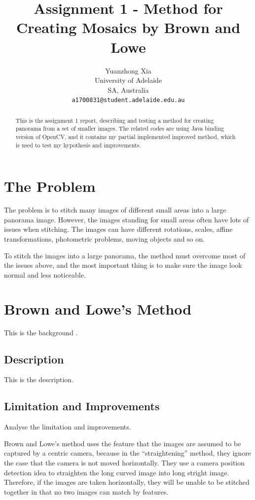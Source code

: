 \documentclass[10pt,twocolumn,letterpaper]{article}
\begin{document}
\title{Assignment 1 - Method for Creating Mosaics by Brown and Lowe}
\author{Yuanzhong Xia\\
University of Adelaide\\
SA, Australia\\
{\tt\small a1700831@student.adelaide.edu.au}
}
\maketitle

\begin{abstract}
This is the assignment 1 report, describing and testing a method for creating panorama from a set of smaller images.
The related codes are using Java binding version of OpenCV, and it contains my partial implemented improved method, which is used to test my hypothesis and improvements.
\end{abstract}


\section{The Problem}
The problem is to stitch many images of different small areas into a large panorama image.
However, the images standing for small areas often have lots of issues when stitching.
The images can have different rotations, scales, affine transformations, photometric problems, moving objects and so on.

To stitch the images into a large panorama, the method must overcome most of the issues above,
and the most important thing is to make sure the image look normal and less noticeable.


\section{Brown and Lowe's Method}
This is the background \cite{origin}.

\subsection{Description}
This is the description.

\subsection{Limitation and Improvements}
Analyse the limitation and improvements.

Brown and Lowe's method uses the feature that the images are assumed to be captured by a centric camera,
because in the ``straightening'' method, they ignore the case that the camera is not moved horizontally.
They use a camera position detection idea to straighten the long curved image into long stright image.
Therefore, if the images are taken horizontally, they will be unable to be stitched together in that no two images can match by features.
\end{document}
